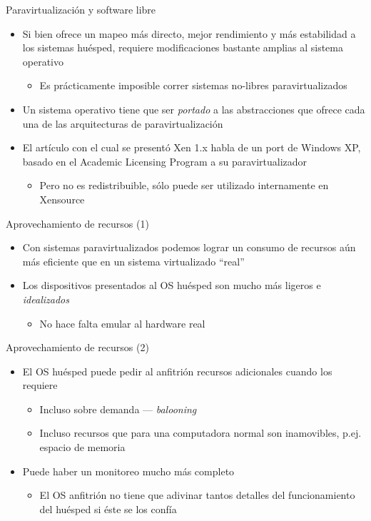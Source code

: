 \documentclass[presentation]{beamer}
\begin{document}
\begin{frame}[label={sec:org3a34915}]{Paravirtualización y software libre}
\begin{itemize}
\item Si bien ofrece un mapeo más directo, mejor rendimiento y más
estabilidad a los sistemas huésped, requiere modificaciones
bastante amplias al sistema operativo
\begin{itemize}
\item Es prácticamente imposible correr sistemas no-libres
paravirtualizados
\end{itemize}
\item Un sistema operativo tiene que ser \emph{portado} a las abstracciones
que ofrece cada una de las arquitecturas de paravirtualización
\item El artículo con el cual se presentó Xen 1.x habla de un port de
Windows XP, basado en el Academic Licensing Program a su
paravirtualizador
\begin{itemize}
\item Pero no es redistribuible, sólo puede ser utilizado internamente
en Xensource
\end{itemize}
\end{itemize}
\end{frame}

\begin{frame}[label={sec:org14712b5}]{Aprovechamiento de recursos (1)}
\begin{itemize}
\item Con sistemas paravirtualizados podemos lograr un consumo de recursos
aún más eficiente que en un sistema virtualizado ``real''
\item Los dispositivos presentados al OS huésped son mucho más ligeros e
\emph{idealizados}
\begin{itemize}
\item No hace falta emular al hardware real
\end{itemize}
\end{itemize}
\end{frame}

\begin{frame}[label={sec:orgfa0ca70}]{Aprovechamiento de recursos (2)}
\begin{itemize}
\item El OS huésped puede pedir al anfitrión recursos adicionales cuando
los requiere
\begin{itemize}
\item Incluso sobre demanda — \emph{balooning}
\item Incluso recursos que para una computadora normal son inamovibles,
p.ej. espacio de memoria
\end{itemize}
\item Puede haber un monitoreo mucho más completo
\begin{itemize}
\item El OS anfitrión no tiene que adivinar tantos detalles del
funcionamiento del huésped si éste se los confía
\end{itemize}
\end{itemize}
\end{frame}
\end{document}
